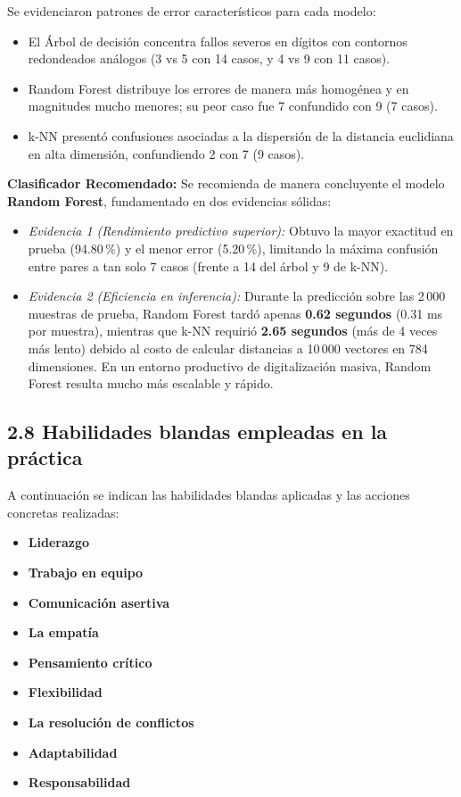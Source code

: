 \documentclass[11pt,a4paper]{article}
\begin{document}
\begin{enumerate}[leftmargin=*]
    Se evidenciaron patrones de error característicos para cada modelo:
    \begin{itemize}[noitemsep]
        \item El Árbol de decisión concentra fallos severos en dígitos con contornos redondeados análogos (3 vs 5 con 14 casos, y 4 vs 9 con 11 casos).
        \item Random Forest distribuye los errores de manera más homogénea y en magnitudes mucho menores; su peor caso fue 7 confundido con 9 (7 casos).
        \item k-NN presentó confusiones asociadas a la dispersión de la distancia euclidiana en alta dimensión, confundiendo 2 con 7 (9 casos).
    \end{itemize}
    
    \textbf{Clasificador Recomendado:} Se recomienda de manera concluyente el modelo \textbf{Random Forest}, fundamentado en dos evidencias sólidas:
    \begin{itemize}[noitemsep]
        \item \textit{Evidencia 1 (Rendimiento predictivo superior):} Obtuvo la mayor exactitud en prueba (94.80\,\%) y el menor error (5.20\,\%), limitando la máxima confusión entre pares a tan solo 7 casos (frente a 14 del árbol y 9 de k-NN).
        \item \textit{Evidencia 2 (Eficiencia en inferencia):} Durante la predicción sobre las 2\,000 muestras de prueba, Random Forest tardó apenas \textbf{0.62 segundos} (0.31 ms por muestra), mientras que k-NN requirió \textbf{2.65 segundos} (más de 4 veces más lento) debido al costo de calcular distancias a 10\,000 vectores en 784 dimensiones. En un entorno productivo de digitalización masiva, Random Forest resulta mucho más escalable y rápido.
    \end{itemize}
\end{enumerate}

\subsection*{2.8 Habilidades blandas empleadas en la práctica}
A continuación se indican las habilidades blandas aplicadas y las acciones concretas realizadas:

\begin{itemize}[leftmargin=*,labelsep=0.3cm]
    \item[$\square$] \textbf{Liderazgo}
    \item[$\boxtimes$] \textbf{Trabajo en equipo}
    \item[$\boxtimes$] \textbf{Comunicación asertiva} 
    \item[$\square$] \textbf{La empatía}
    \item[$\boxtimes$] \textbf{Pensamiento crítico}
    \item[$\square$] \textbf{Flexibilidad}
    \item[$\square$] \textbf{La resolución de conflictos}
    \item[$\square$] \textbf{Adaptabilidad}
    \item[$\boxtimes$] \textbf{Responsabilidad} 
\end{itemize}
\end{document}
